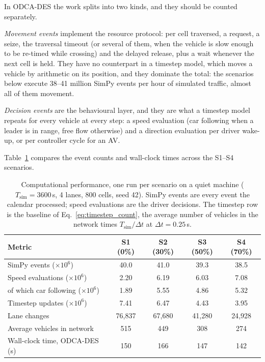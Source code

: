 \documentclass[review,authoryear]{elsarticle}
\begin{document}
In ODCA-DES the work splits into two kinds, and they should be counted separately.

\emph{Movement events} implement the resource protocol: per cell traversed, a request, a seize, the traversal timeout (or several of them, when the vehicle is slow enough to be re-timed while crossing) and the delayed release, plus a wait whenever the next cell is held. They have no counterpart in a timestep model, which moves a vehicle by arithmetic on its position, and they dominate the total: the scenarios below execute 38--41 million SimPy events per hour of simulated traffic, almost all of them movement.

\emph{Decision events} are the behavioural layer, and they are what a timestep model repeats for every vehicle at every step: a speed evaluation (car following when a leader is in range, free flow otherwise) and a direction evaluation per driver wake-up, or per controller cycle for an AV.

Table~\ref{tab:computational} compares the event counts and wall-clock times across the S1--S4 scenarios.

\begin{table}[ht]
\centering
\caption{Computational performance, one run per scenario on a quiet machine ($T_{\text{sim}} = 3600$\,s, 4 lanes, 800 cells, seed 42). SimPy events are every event the calendar processed; speed evaluations are the driver decisions. The timestep row is the baseline of Eq.~\eqref{eq:timestep_count}, the average number of vehicles in the network times $T_{\text{sim}} / \Delta t$ at $\Delta t = 0.25$\,s.}
\label{tab:computational}
\begin{tabular}{@{}lcccc@{}}
\toprule
Metric & S1 (0\%) & S2 (30\%) & S3 (50\%) & S4 (70\%) \\
\midrule
SimPy events ($\times 10^6$) & 40.0 & 41.0 & 39.3 & 38.5 \\
Speed evaluations ($\times 10^6$) & 2.20 & 6.19 & 6.03 & 7.08 \\
of which car following ($\times 10^6$) & 1.89 & 5.55 & 4.86 & 5.32 \\
Timestep updates ($\times 10^6$) & 7.41 & 6.47 & 4.43 & 3.95 \\
Lane changes & 76{,}837 & 67{,}680 & 41{,}280 & 24{,}928 \\
Average vehicles in network & 515 & 449 & 308 & 274 \\
Wall-clock time, ODCA-DES (s) & 150 & 166 & 147 & 142 \\
\bottomrule
\end{tabular}
\end{table}
\end{document}
